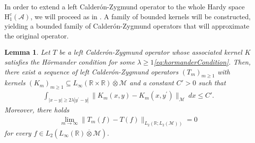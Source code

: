 \documentclass[psamsfonts]{amsart}
\newtheorem{lemma}[theorem]{Lemma}
\newcommand{\Linfty}{L_\infty}
\newcommand{\Ltwo}{L_2}
\newcommand{\Honec}{\mathrm{H}_1^c}
\newcommand{\Hardyc}{\Honec(\mathcal{A})}
\newcommand{\Avnat}{\Linfty(\mathbb{R}) \overline{\otimes} \mathcal{M}}
\begin{document}
    In order to extend a left Calder\'on-Zygmund operator to the whole Hardy space $\Hardyc$, we will proceed as in \cite{MeyC97}. A family of bounded kernels will be constructed, yielding a bounded family of Calder\'on-Zygmund operators that will approximate the original operator.
     
    \begin{lemma}\label{lem:approxKernel}
      Let $T$ be a left Calder\'on-Zygmund operator whose associated
      kernel $K$ satisfies the Hörmander condition  for some $\lambda \geq 1$\eqref{eq:hormanderCondition}. Then, there exist a sequence of left Calder\'on-Zygmund operators $(T_m)_{m\geq 1}$ with
      kernels
      $(K_m)_{m \geq 1} \subseteq \Linfty(\mathbb{R} \times
      \mathbb{R}) \overline{\otimes} \mathcal{M}$ and a constant
      $C'>0$ such that
        \begin{align}\label{eq:weakerHormander}
            \int_{|x-y| \geq 2\lambda |y^\prime-y|} \|K_m(x,y) - K_m(x,y^\prime)\|_{\mathcal{M}} \ dx \leq C'.
        \end{align}
         Moreover, there holds
            \begin{align*}
                \lim_{m \rightarrow \infty} \|T_m(f) - T(f) \|_{\Ltwo(\mathbb{R};\Ltwo(\mathcal{M}))} = 0
            \end{align*}
            for every $f \in \Ltwo(\Avnat)$.
    \end{lemma}
    
\end{document}
